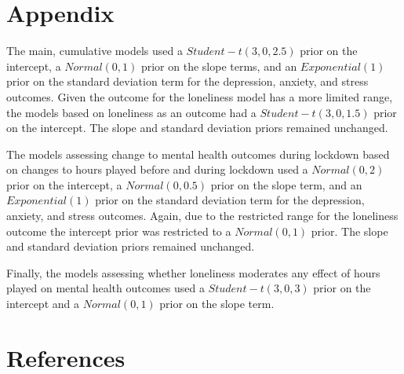 \documentclass[
  english,
  man,floatsintext]{apa6}
\begin{document}
\newpage

\hypertarget{appendix}{%
\section{Appendix}\label{appendix}}

The main, cumulative models used a \(Student-t(3, 0, 2.5)\) prior on the intercept, a \(Normal(0, 1)\) prior on the slope terms, and an \(Exponential(1)\) prior on the standard deviation term for the depression, anxiety, and stress outcomes. Given the outcome for the loneliness model has a more limited range, the models based on loneliness as an outcome had a \(Student-t(3, 0, 1.5)\) prior on the intercept. The slope and standard deviation priors remained unchanged.

The models assessing change to mental health outcomes during lockdown based on changes to hours played before and during lockdown used a \(Normal(0, 2)\) prior on the intercept, a \(Normal(0, 0.5)\) prior on the slope term, and an \(Exponential(1)\) prior on the standard deviation term for the depression, anxiety, and stress outcomes. Again, due to the restricted range for the loneliness outcome the intercept prior was restricted to a \(Normal(0, 1)\) prior. The slope and standard deviation priors remained unchanged.

Finally, the models assessing whether loneliness moderates any effect of hours played on mental health outcomes used a \(Student-t(3, 0, 3)\) prior on the intercept and a \(Normal(0, 1)\) prior on the slope term.

\newpage

\hypertarget{references}{%
\section{References}\label{references}}

\begingroup
\setlength{\parindent}{-0.5in}
\setlength{\leftskip}{0.5in}
\end{document}
